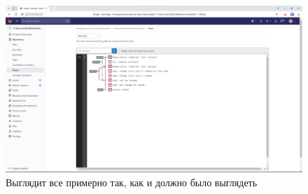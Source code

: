 \documentclass[a4paper]{article}
\begin{document}
  \begin{figure}[H]
    \centering
    \includegraphics[width=\textwidth]{1_ (1)}
    \caption{Выглядит все примерно так, как и должно было выглядеть}
  \end{figure}
\end{document}
